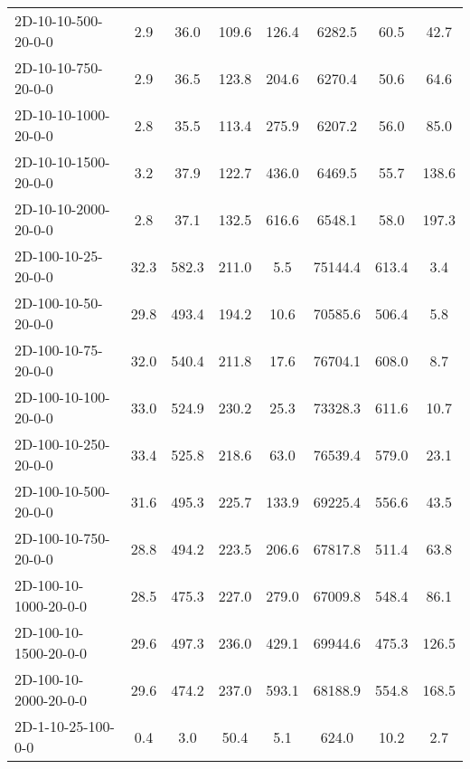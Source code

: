 \documentclass{article}
\begin{document}
\begin{table}[h]
\begin{center}
\begin{tabular}{|l||c|c|c|c|c|c|c|}
            2D-10-10-500-20-0-0            & 2.9  & 36.0      & 109.6      & 126.4       & 6282.5   & 60.5      & 42.7       \\
            2D-10-10-750-20-0-0            & 2.9  & 36.5      & 123.8      & 204.6       & 6270.4   & 50.6      & 64.6       \\
            2D-10-10-1000-20-0-0           & 2.8  & 35.5      & 113.4      & 275.9       & 6207.2   & 56.0      & 85.0       \\
            2D-10-10-1500-20-0-0           & 3.2  & 37.9      & 122.7      & 436.0       & 6469.5   & 55.7      & 138.6      \\
            2D-10-10-2000-20-0-0           & 2.8  & 37.1      & 132.5      & 616.6       & 6548.1   & 58.0      & 197.3      \\
            \hline
            2D-100-10-25-20-0-0            & 32.3 & 582.3     & 211.0      & 5.5         & 75144.4  & 613.4     & 3.4        \\
            2D-100-10-50-20-0-0            & 29.8 & 493.4     & 194.2      & 10.6        & 70585.6  & 506.4     & 5.8        \\
            2D-100-10-75-20-0-0            & 32.0 & 540.4     & 211.8      & 17.6        & 76704.1  & 608.0     & 8.7        \\
            2D-100-10-100-20-0-0           & 33.0 & 524.9     & 230.2      & 25.3        & 73328.3  & 611.6     & 10.7       \\
            2D-100-10-250-20-0-0           & 33.4 & 525.8     & 218.6      & 63.0        & 76539.4  & 579.0     & 23.1       \\
            2D-100-10-500-20-0-0           & 31.6 & 495.3     & 225.7      & 133.9       & 69225.4  & 556.6     & 43.5       \\
            2D-100-10-750-20-0-0           & 28.8 & 494.2     & 223.5      & 206.6       & 67817.8  & 511.4     & 63.8       \\
            2D-100-10-1000-20-0-0          & 28.5 & 475.3     & 227.0      & 279.0       & 67009.8  & 548.4     & 86.1       \\
            2D-100-10-1500-20-0-0          & 29.6 & 497.3     & 236.0      & 429.1       & 69944.6  & 475.3     & 126.5      \\
            2D-100-10-2000-20-0-0          & 29.6 & 474.2     & 237.0      & 593.1       & 68188.9  & 554.8     & 168.5      \\
            \hline
            2D-1-10-25-100-0-0             & 0.4  & 3.0       & 50.4       & 5.1         & 624.0    & 10.2      & 2.7        \\

\end{tabular}
\end{center}
\end{table}
\end{document}
